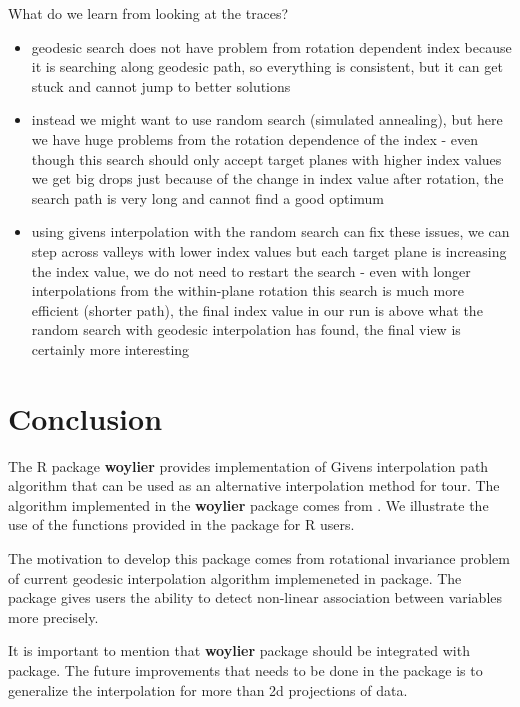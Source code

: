 What do we learn from looking at the traces?

\begin{itemize}
\tightlist
\item
  geodesic search does not have problem from rotation dependent index
  because it is searching along geodesic path, so everything is
  consistent, but it can get stuck and cannot jump to better solutions
\item
  instead we might want to use random search (simulated annealing), but
  here we have huge problems from the rotation dependence of the index -
  even though this search should only accept target planes with higher
  index values we get big drops just because of the change in index
  value after rotation, the search path is very long and cannot find a
  good optimum
\item
  using givens interpolation with the random search can fix these
  issues, we can step across valleys with lower index values but each
  target plane is increasing the index value, we do not need to restart
  the search - even with longer interpolations from the within-plane
  rotation this search is much more efficient (shorter path), the final
  index value in our run is above what the random search with geodesic
  interpolation has found, the final view is certainly more interesting
\end{itemize}

\hypertarget{conclusion}{%
\section{Conclusion}\label{conclusion}}

The R package \textbf{woylier} provides implementation of Givens
interpolation path algorithm that can be used as an alternative
interpolation method for tour. The algorithm implemented in the
\textbf{woylier} package comes from
\citet{buja_cook_asimov_hurley_2005}. We illustrate the use of the
functions provided in the package for R users.

The motivation to develop this package comes from rotational invariance
problem of current geodesic interpolation algorithm implemeneted in
 package. The package gives users the ability to detect
non-linear association between variables more precisely.

It is important to mention that \textbf{woylier} package should be
integrated with  package. The future improvements that
needs to be done in the package is to generalize the interpolation for
more than 2d projections of data.

